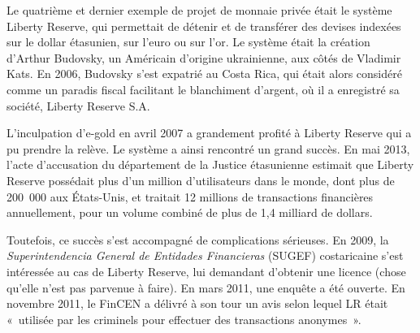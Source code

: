 
Le quatrième et dernier exemple de projet de monnaie privée était le système Liberty Reserve, qui permettait de détenir et de transférer des devises indexées sur le dollar étasunien, sur l'euro ou sur l'or. Le système était la création d'Arthur Budovsky, un Américain d'origine ukrainienne, aux côtés de Vladimir Kats. En 2006, Budovsky s'est expatrié au Costa Rica, qui était alors considéré comme un paradis fiscal facilitant le blanchiment d'argent, où il a enregistré sa société, Liberty Reserve S.A.  %

L'inculpation d'e-gold en avril 2007 a grandement profité à Liberty Reserve qui a pu prendre la relève. Le système a ainsi rencontré un grand succès. En mai 2013, l'acte d'accusation du département de la Justice étasunienne estimait que Liberty Reserve possédait plus d'un million d'utilisateurs dans le monde, dont plus de 200~000 aux États-Unis, et traitait 12 millions de transactions financières annuellement, pour un volume combiné de plus de 1,4 milliard de dollars.

Toutefois, ce succès s'est accompagné de complications sérieuses. En 2009, la \emph{Superintendencia General de Entidades Financieras} (SUGEF) costaricaine s'est intéressée au cas de Liberty Reserve, lui demandant d'obtenir une licence (chose qu'elle n'est pas parvenue à faire). En mars 2011, une enquête a été ouverte. En novembre 2011, le FinCEN a délivré à son tour un avis selon lequel LR était «~utilisée par les criminels pour effectuer des transactions anonymes~».


